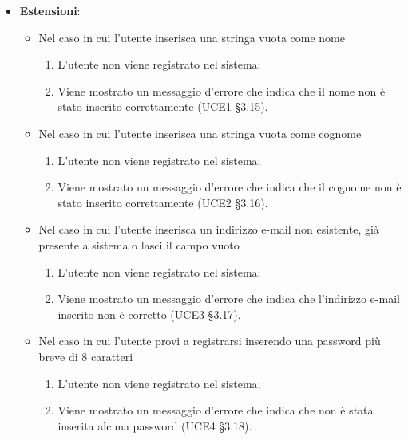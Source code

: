 \begin{itemize}
\item \textbf{Estensioni}:
\begin{itemize}
\item Nel caso in cui l'utente inserisca una stringa vuota come nome
\begin{enumerate}
	\item L'utente non viene registrato nel sistema;
	\item Viene mostrato un messaggio d'errore che indica che il nome non è stato inserito correttamente (UCE1 §3.15).
\end{enumerate}
\item Nel caso in cui l'utente inserisca una stringa vuota come cognome
\begin{enumerate}
	\item L'utente non viene registrato nel sistema;
	\item Viene mostrato un messaggio d'errore che indica che il cognome non è stato inserito correttamente (UCE2 §3.16).
\end{enumerate}
\item Nel caso in cui l’utente inserisca un indirizzo e-mail non esistente, già presente a sistema o lasci il campo vuoto
\begin{enumerate}
	\item L’utente non viene registrato nel sistema;
	\item Viene mostrato un messaggio d’errore che indica che l'indirizzo e-mail inserito non è corretto (UCE3 §3.17).
\end{enumerate}
\item Nel caso in cui l’utente provi a registrarsi inserendo una password più breve di 8 caratteri
\begin{enumerate}
	\item L’utente non viene registrato nel sistema;
	\item Viene mostrato un messaggio d’errore che indica che non è stata inserita alcuna password (UCE4 §3.18).
\end{enumerate}
\end{itemize}
\end{itemize}